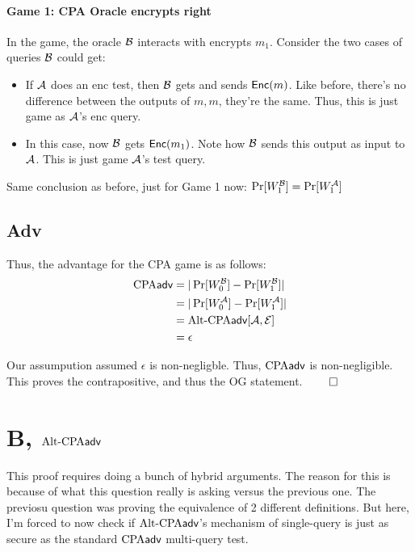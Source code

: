 \documentclass[12pt]{article}
\theoremstyle{plain}
\theoremstyle{definition}
\begin{document}
\begin{solution}
\paragraph{Game 1: CPA Oracle encrypts right} In the game, the $\text{oracle}$ $\mathcal{B}$ interacts with encrypts $m_1$. Consider the two cases of queries $\mathcal{B}$ could get:
\begin{itemize}
  \item[$m$] If $\mathcal{A}$ does an enc test, then $\mathcal{B}$ gets and sends $\textsf{\upshape Enc}(m)$. Like before, there's no difference between the outputs of $m, m$, they're the same.
  Thus, this is just game as $\mathcal{A}$'s enc query.
  \item[$(m, m)$] In this case, now $\mathcal{B}$ gets $\textsf{\upshape Enc}(m_1)$. Note how $\mathcal{B}$ sends this output as input to $\mathcal{A}$. This is just game $\mathcal{A}$'s test query.
\end{itemize}
\noindent Same conclusion as before, just for Game 1 now: $\Pr[W^{\mathcal{B}}_1] = \Pr[W^{\mathcal{A}}_1]$

\subsection*{Adv}
Thus, the advantage for the CPA game is as follows:
\begin{equation*}
  \begin{aligned}
    \textrm{CPA}\textsf{adv} &= |\Pr[W^{\mathcal{B}}_0] - \Pr[W^{\mathcal{B}}_1]|\\
    &= |\Pr[W^{\mathcal{A}}_0] - \Pr[W^{\mathcal{A}}_1]|\\
    &= \textrm{Alt-CPA}\textsf{adv}[\mathcal{A}, \mathcal{E}]\\
    &= \epsilon
  \end{aligned}
\end{equation*}

\noindent Our assumpution assumed $\epsilon$ is non-negligble. Thus, $\textrm{CPA}\textsf{adv}$ is non-negligible.\\

\noindent This proves the contrapositive, and thus the OG statement. $\qed$

\section*{B, $\textrm{Alt-CPA}\textsf{adv}$}
This proof requires doing a bunch of hybrid arguments. The reason for this is because of what this question really is asking versus the previous one.
The previosu question was proving the equivalence of 2 different definitions. But here, I'm forced to now check if $\textrm{Alt-CPA}\textsf{adv}$'s mechanism of single-query
is just as secure as the  standard $\textrm{CPA}\textsf{adv}$ multi-query test.\\


\end{solution}
\end{document}
